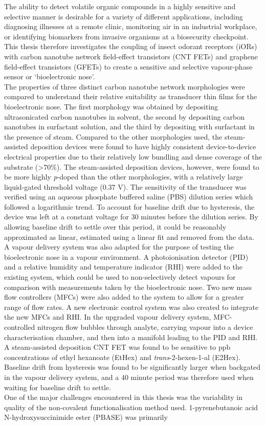 The ability to detect volatile organic compounds in a highly sensitive and selective manner is desirable for a variety of different applications, including diagnosing illnesses at a remote clinic, monitoring air in an industrial workplace, or identifying biomarkers from invasive organisms at a biosecurity checkpoint. This thesis therefore investigates the coupling of insect odorant receptors (iORs) with carbon nanotube network field-effect transistors (CNT FETs) and graphene field-effect transistors (GFETs) to create a sensitive and selective vapour-phase sensor or ‘bioelectronic nose’. \\[5pt] The properties of three distinct carbon nanotube network morphologies were compared to understand their relative suitability as transducer thin films for the bioelectronic nose. The first morphology was obtained by depositing ultrasonicated carbon nanotubes in solvent, the second by depositing carbon nanotubes in surfactant solution, and the third by depositing with surfactant in the presence of steam. Compared to the other morphologies used, the steam-assisted deposition devices were found to have highly consistent device-to-device electrical properties due to their relatively low bundling and dense coverage of the substrate (>70\%). The steam-assisted deposition devices, however, were found to be more highly \textit{p}-doped than the other morphologies, with a relatively large liquid-gated threshold voltage (0.37 V). The sensitivity of the transducer was verified using an aqueous phosphate buffered saline (PBS) dilution series which followed a logarithmic trend. To account for baseline drift due to hysteresis, the device was left at a constant voltage for 30 minutes before the dilution series. By allowing baseline drift to settle over this period, it could be reasonably approximated as linear, estimated using a linear fit and removed from the data. \\[5pt] A vapour delivery system was also adapted for the purpose of testing the bioelectronic nose in a vapour environment. A photoionisation detector (PID) and a relative humidity and temperature indicator (RHI) were added to the existing system, which could be used to non-selectively detect vapours for comparison with measurements taken by the bioelectronic nose. Two new mass flow controllers (MFCs) were also added to the system to allow for a greater range of flow rates. A new electronic control system was also created to integrate the new MFCs and RHI. In the upgraded vapour delivery system, MFC-controlled nitrogen flow bubbles through analyte, carrying vapour into a device characterisation chamber, and then into a manifold leading to the PID and RHI. A steam-assisted deposition CNT FET was found to be sensitive to ppb concentrations of ethyl hexanoate (EtHex) and \textit{trans}-2-hexen-1-al (E2Hex). Baseline drift from hysteresis was found to be significantly larger when backgated in the vapour delivery system, and a 40 minute period was therefore used when waiting for baseline drift to settle. \\[5pt] One of the major challenges encountered in this thesis was the variability in quality of the non-covalent functionalisation method used. 1-pyrenebutanoic acid N-hydroxysuccinimide ester (PBASE) was primarily 